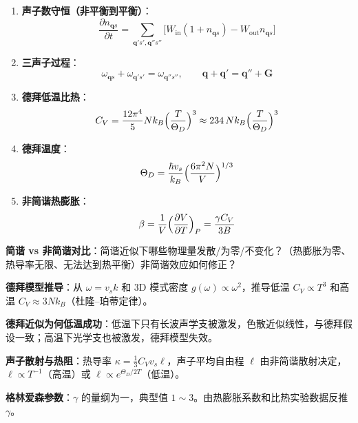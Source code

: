 \begin{formulabox}[核心公式]
\begin{enumerate}[label=\textbf{(\arabic*)}]
    \item \textbf{声子数守恒（非平衡到平衡）}：
    \[
    \frac{\partial n_{\mathbf{q}s}}{\partial t}=\sum_{\mathbf{q}'s',\mathbf{q}''s''}\bigl[W_{\text{in}}(1+n_{\mathbf{q}s})-W_{\text{out}}n_{\mathbf{q}s}\bigr]
    \]

    \item \textbf{三声子过程}：
    \[
    \omega_{\mathbf{q}s}+\omega_{\mathbf{q}'s'}=\omega_{\mathbf{q}''s''},\qquad
    \mathbf{q}+\mathbf{q}'=\mathbf{q}''+\mathbf{G}
    \]

    \item \textbf{德拜低温比热}：
    \[
    C_V=\frac{12\pi^4}{5}Nk_B\Bigl(\frac{T}{\Theta_D}\Bigr)^3\approx234\,Nk_B\Bigl(\frac{T}{\Theta_D}\Bigr)^3
    \]

    \item \textbf{德拜温度}：
    \[
    \Theta_D=\frac{\hbar v_s}{k_B}\Bigl(\frac{6\pi^2N}{V}\Bigr)^{1/3}
    \]

    \item \textbf{非简谐热膨胀}：
    \[
    \beta=\frac{1}{V}\Bigl(\frac{\partial V}{\partial T}\Bigr)_P=\frac{\gamma C_V}{3B}
    \]
\end{enumerate}
\end{formulabox}

\begin{drillbox}[训练点与考法变体]
 \textbf{简谐 vs 非简谐对比}：简谐近似下哪些物理量发散/为零/不变化？（热膨胀为零、热导率无限、无法达到热平衡）非简谐效应如何修正？

 \textbf{德拜模型推导}：从 $\omega=v_s k$ 和 3D 模式密度 $g(\omega)\propto\omega^2$，推导低温 $C_V\propto T^3$ 和高温 $C_V\approx3Nk_B$（杜隆--珀蒂定律）。

 \textbf{德拜近似为何低温成功}：低温下只有长波声学支被激发，色散近似线性，与德拜假设一致；高温下光学支也被激发，德拜模型失效。

 \textbf{声子散射与热阻}：热导率 $\kappa=\frac{1}{3}C_V v_s \ell$，声子平均自由程 $\ell$ 由非简谐散射决定，$\ell\propto T^{-1}$（高温）或 $\ell\propto e^{\Theta_D/2T}$（低温）。

 \textbf{格林爱森参数}：$\gamma$ 的量纲为一，典型值 $1\sim3$。由热膨胀系数和比热实验数据反推 $\gamma$。
\end{drillbox}

